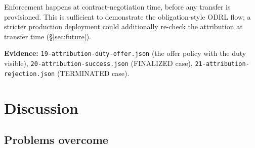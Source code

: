 \documentclass[11pt,a4paper]{article}
\DeclareRobustCommand{\code}[1]{\texttt{\small #1}}
\begin{document}
Enforcement happens at contract-negotiation time, before any transfer
is provisioned. This is sufficient to demonstrate the obligation-style
ODRL flow; a stricter production deployment could additionally re-check
the attribution at transfer time (\S\ref{sec:future}).

\noindent\textbf{Evidence:} \code{19-attribution-duty-offer.json}
(the offer policy with the duty visible),
\code{20-attribution-success.json} (FINALIZED case),
\code{21-attribution-rejection.json} (TERMINATED case).

\section{Discussion}
\label{sec:disc}

\subsection{Problems overcome}
\end{document}
